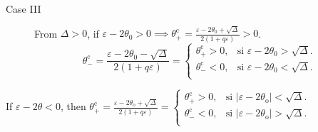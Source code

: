 \documentclass[
    8pt,
    aspectratio=1610,
    c,
    intlimits,
    leqno,
    professionalfonts,
]{beamer}
\begin{document}
\begin{frame}
	\begin{description}
		\item[Case III]

		      From $\Delta>0$, if $\varepsilon-2\theta_{0}>0\implies\theta^{\text{c}}_{+}=\frac{\varepsilon-2\theta_{0}+\sqrt{\Delta}}{2\left(1+q\varepsilon\right)}>0$.
		      \begin{equation*}
			      \theta^{\text{c}}_{-}=
			      \frac{\varepsilon-2\theta_{0}-\sqrt{\Delta}}{2\left(1+q\varepsilon\right)}=
			      \begin{cases}
				      \theta^{\text{c}}_{+}>0, & \text{si }\varepsilon-2\theta_{0}>\sqrt{\Delta}.     \\
				      \theta^{\text{c}}_{-}<0, & \text{si }\varepsilon-2\theta_{0}<\sqrt{\Delta}. \\
			      \end{cases}
		      \end{equation*}
	\end{description}

	If $\varepsilon-2\theta<0$, then
	\begin{math}
		\theta^{\text{c}}_{+}=\frac{\varepsilon-2\theta_{\text{o}}+\sqrt{\Delta}}{2\left(1+q\varepsilon\right)}=
		\begin{cases}
			\theta^{\text{c}}_{+}>0, & \text{si }\left|\varepsilon-2\theta_{\text{o}}\right|<\sqrt{\Delta}. \\
			\theta^{\text{c}}_{-}<0, & \text{si }\left|\varepsilon-2\theta_{\text{o}}\right|>\sqrt{\Delta}. \\
		\end{cases}
	\end{math}
\end{frame}
\end{document}

